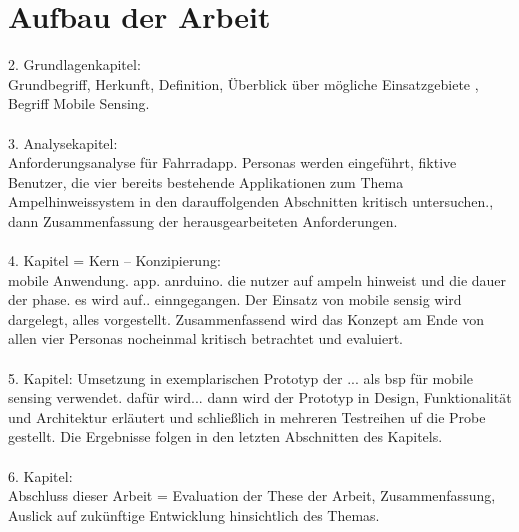 \section{Aufbau der Arbeit}
2. Grundlagenkapitel:\\
Grundbegriff, Herkunft, Definition, Überblick über mögliche Einsatzgebiete , Begriff Mobile Sensing.\\\\
3. Analysekapitel:\\
Anforderungsanalyse für Fahrradapp. Personas werden eingeführt, fiktive Benutzer, die vier bereits bestehende Applikationen zum Thema Ampelhinweissystem in den darauffolgenden Abschnitten kritisch untersuchen., dann Zusammenfassung der herausgearbeiteten Anforderungen.\\\\
4. Kapitel = Kern -- Konzipierung:\\
mobile Anwendung. app. anrduino. die nutzer auf ampeln hinweist und die dauer der phase. 
es wird auf.. einngegangen. Der Einsatz von mobile sensig wird dargelegt, alles vorgestellt.
Zusammenfassend wird das Konzept am Ende von allen vier Personas nocheinmal kritisch betrachtet und evaluiert.\\\\
5. Kapitel: Umsetzung in exemplarischen Prototyp der ... als bsp für mobile sensing verwendet. dafür wird... 
dann wird der Prototyp in Design, Funktionalität und Architektur erläutert und schließlich in mehreren Testreihen uf die Probe gestellt. Die Ergebnisse folgen in den letzten Abschnitten des Kapitels.\\\\
6. Kapitel: \\
Abschluss dieser Arbeit = Evaluation der These der Arbeit, Zusammenfassung, Auslick auf zukünftige Entwicklung hinsichtlich des Themas.
